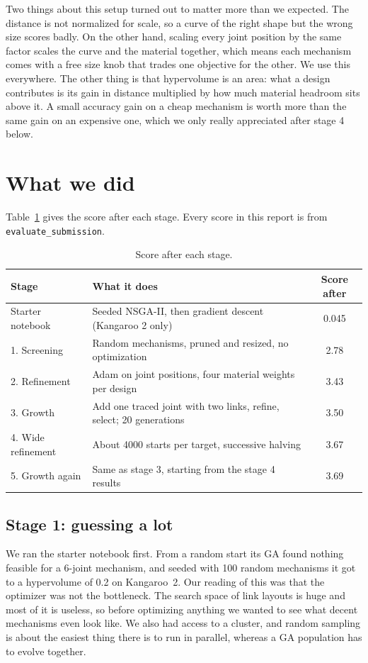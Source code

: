 \documentclass[11pt]{article}
\begin{document}
Two things about this setup turned out to matter more than we expected. The
distance is not normalized for scale, so a curve of the right shape but the
wrong size scores badly. On the other hand, scaling every joint position by
the same factor scales the curve and the material together, which means each
mechanism comes with a free size knob that trades one objective for the other.
We use this everywhere. The other thing is that hypervolume is an area: what a
design contributes is its gain in distance multiplied by how much material
headroom sits above it. A small accuracy gain on a cheap mechanism is worth
more than the same gain on an expensive one, which we only really appreciated
after stage 4 below.

\section{What we did}
\label{sec:approach}

Table~\ref{tab:stages} gives the score after each stage. Every score in this
report is from \texttt{evaluate\_submission}.

\begin{table}[H]
\centering
\begin{tabular}{lp{8.3cm}c}
\toprule
Stage & What it does & Score after \\
\midrule
Starter notebook & Seeded NSGA-II, then gradient descent (Kangaroo 2 only) & 0.045 \\
1. Screening & Random mechanisms, pruned and resized, no optimization & 2.78 \\
2. Refinement & Adam on joint positions, four material weights per design & 3.43 \\
3. Growth & Add one traced joint with two links, refine, select; 20 generations & 3.50 \\
4. Wide refinement & About 4000 starts per target, successive halving & 3.67 \\
5. Growth again & Same as stage 3, starting from the stage 4 results & 3.69 \\
\bottomrule
\end{tabular}
\caption{Score after each stage.}
\label{tab:stages}
\end{table}

\subsection{Stage 1: guessing a lot}

We ran the starter notebook first. From a random start its GA found nothing
feasible for a 6-joint mechanism, and seeded with 100 random mechanisms it got
to a hypervolume of 0.2 on Kangaroo~2. Our reading of this was that the
optimizer was not the bottleneck. The search space of link layouts is huge and
most of it is useless, so before optimizing anything we wanted to see what
decent mechanisms even look like. We also had access to a cluster, and random
sampling is about the easiest thing there is to run in parallel, whereas a GA
population has to evolve together.
\end{document}
